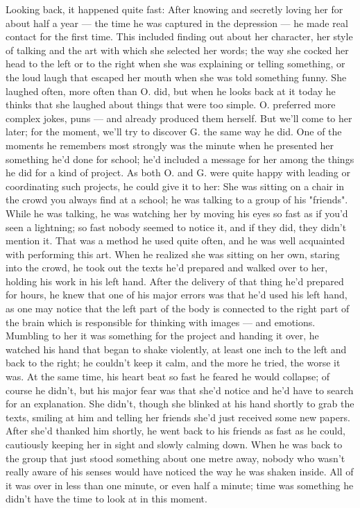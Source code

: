 Looking back, it happened quite fast: After knowing and secretly loving her for about half a year --- the time he was captured in the depression --- he made real contact for the first time. This included finding out about her character, her style of talking and the art with which she selected her words; the way she cocked her head to the left or to the right when she was explaining or telling something, or the loud laugh that escaped her mouth when she was told something funny. She laughed often, more often than O. did, but when he looks back at it today he thinks that she laughed about things that were too simple. O. preferred more complex jokes, puns --- and already produced them herself. But we'll come to her later; for the moment, we'll try to discover G. the same way he did. 
One of the moments he remembers most strongly was the minute when he presented her something he'd done for school; he'd included a message for her among the things he did for a kind of project. As both O. and G. were quite happy with leading or coordinating such projects, he could give it to her:
She was sitting on a chair in the crowd you always find at a school; he was talking to a group of his "friends". While he was talking, he was watching her by moving his eyes so fast as if you'd seen a lightning; so fast nobody seemed to notice it, and if they did, they didn't mention it. That was a method he used quite often, and he was well acquainted with performing this art. When he realized she was sitting on her own, staring into the crowd, he took out the texts he'd prepared and walked over to her, holding his work in his left hand. After the delivery of that thing he'd prepared for hours, he knew that one of his major errors was that he'd used his left hand, as one may notice that the left part of the body is connected to the right part of the brain which is responsible for thinking with images --- and emotions. Mumbling to her it was something for the project and handing it over, he watched his hand that began to shake violently, at least one inch to the left and back to the right; he couldn't keep it calm, and the more he tried, the worse it was. At the same time, his heart beat so fast he feared he would collapse; of course he didn't, but his major fear was that she'd notice and he'd have to search for an explanation. She didn't, though she blinked at his hand shortly to grab the texts, smiling at him and telling her friends she'd just received some new papers. After she'd thanked him shortly, he went back to his friends as fast as he could, cautiously keeping her in sight and slowly calming down. When he was back to the group that just stood something about one metre away, nobody who wasn't really aware of his senses would have noticed the way he was shaken inside. All of it was over in less than one minute, or even half a minute; time was something he didn't have the time to look at in this moment. 
